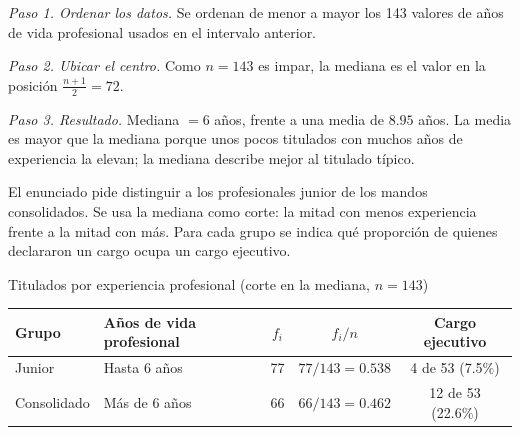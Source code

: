 \textit{Paso 1. Ordenar los datos.} Se ordenan de menor a mayor los 143 valores de años de vida profesional usados en el intervalo anterior.

\textit{Paso 2. Ubicar el centro.} Como $n = 143$ es impar, la mediana es el valor en la posición $\frac{n+1}{2} = 72$.

\textit{Paso 3. Resultado.} Mediana $= 6$ años, frente a una media de $8.95$ años. La media es mayor que la mediana porque unos pocos titulados con muchos años de experiencia la elevan; la mediana describe mejor al titulado típico.

El enunciado pide distinguir a los profesionales junior de los mandos consolidados. Se usa la mediana como corte: la mitad con menos experiencia frente a la mitad con más. Para cada grupo se indica qué proporción de quienes declararon un cargo ocupa un cargo ejecutivo.

\begin{mitabla}{Titulados por experiencia profesional (corte en la mediana, $n=143$)}
\begin{tabular}{llccc}
\toprule
Grupo & Años de vida profesional & $f_i$ & $f_i/n$ & Cargo ejecutivo \\
\midrule
Junior & Hasta 6 años & 77 & $77/143 = 0.538$ & 4 de 53 (7.5\%) \\
Consolidado & Más de 6 años & 66 & $66/143 = 0.462$ & 12 de 53 (22.6\%) \\
\bottomrule
\end{tabular}
\end{mitabla}

